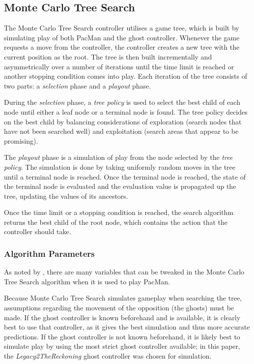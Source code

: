 \subsection{Monte Carlo Tree Search}
The Monte Carlo Tree Search controller utilises a game tree, which is built by simulating play of both PacMan and the ghost controller. Whenever the game requests a move from the controller, the controller creates a new tree with the current position as the root. The tree is then built incrementally and asymmetrically over a number of iterations until the time limit is reached or another stopping condition comes into play. Each iteration of the tree consists of two parts: a \textit{selection} phase and a \textit{playout} phase\cite{pepels2012enhancements}. 

During the \textit{selection} phase, a \textit{tree policy} is used to select the best child of each node until either a leaf node or a terminal node is found. The tree policy decides on the best child by balancing considerations of exploration (search nodes that have not been searched well) and exploitation (search areas that appear to be promising)\cite{browne2012survey}.

The \textit{playout} phase is a simulation of play from the node selected by the \textit{tree policy}. The simulation is done by taking uniformly random moves in the tree until a terminal node is reached. Once the terminal node is reached, the state of the terminal node is evaluated and the evaluation value is propagated up the tree, updating the values of its ancestors\cite{browne2012survey}.

Once the time limit or a stopping condition is reached, the search algorithm returns the best child of the root node, which contains the action that the controller should take.

\subsubsection{Algorithm Parameters}
As noted by \citet{pepels2012enhancements}, there are many variables that can be tweaked in the Monte Carlo Tree Search algorithm when it is used to play PacMan.

Because Monte Carlo Tree Search simulates gameplay when searching the tree, assumptions regarding the movement of the opposition (the ghosts) must be made. If the ghost controller is known beforehand and is available, it is clearly best to use that controller, as it gives the best simulation and thus more accurate predictions. If the ghost controller is not known beforehand, it is likely best to simulate play by using the most strict ghost controller available; in this paper, the \textit{Legacy2TheReckoning} ghost controller was chosen for simulation.

